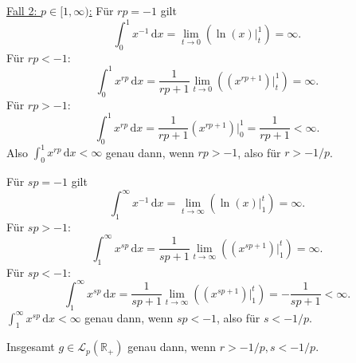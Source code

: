 \documentclass[10pt]{article}\usepackage[]{graphicx}\usepackage[]{color}
\newcommand{\R}{\mathbb{R}}
\newcommand{\df}{\,\textrm{d}}
\begin{document}
\begin{enumerate}[(a)]
        \uline{Fall 2: $p \in [1, \infty)$:}
        Für $rp = -1$ gilt 
        \[
          \int_0^1 x^{-1} \df x = \lim_{t \to 0} \left(\ln(x)|^{1}_t\right) = \infty.
        \]
        Für $rp < -1$:
        \[
          \int_0^1 x^{rp} \df x = \frac{1}{rp+1} \lim_{t \to 0}\left((x^{rp+1})|^1_t\right) = \infty.
        \]
        Für $rp > -1$:
        \[
          \int_0^1 x^{rp} \df x = \frac{1}{rp+1} \left(x^{rp+1}\right)|^1_0 = \frac{1}{rp+1} < \infty.
        \]
        Also $\int_0^{1} x^{rp} \df x < \infty$
        genau dann, wenn $rp > -1$, also für $r > -1/p$.
        
        Für $sp = -1$ gilt
        \[
          \int_1^{\infty} x^{-1} \df x = \lim_{t \to \infty} \left(\ln(x)|^{t}_1\right) = \infty.
        \]
        Für $sp > -1$:
        \[
          \int_1^{\infty} x^{sp} \df x = \frac{1}{sp+1} \lim_{t \to \infty}\left((x^{sp+1})|^t_1\right) = \infty.
        \]
        Für $sp < -1$:
        \[
          \int_1^{\infty} x^{sp} \df x = \frac{1}{sp+1} \lim_{t \to \infty}\left((x^{sp+1})|^t_1\right) = - \frac{1}{sp+1} < \infty.
        \]
        $\int_1^{\infty} x^{sp} \df x < \infty$
        genau dann, wenn $sp < -1$, also für $s < -1/p$.
        
        Insgesamt $g \in \mathscr{L}_p(\R_+)$ genau dann,
        wenn $r > -1/p, s < -1/p$.
        
\end{enumerate}

\end{document}
